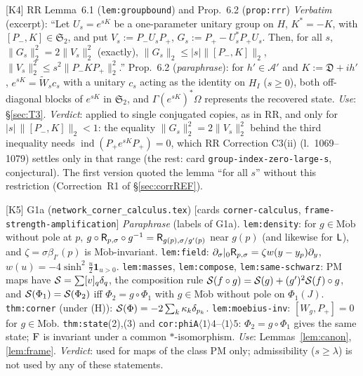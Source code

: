 \documentclass[11pt]{article}
\newcommand{\Pp}{P_+}\newcommand{\Pm}{P_-}\newcommand{\Stwo}{\mathfrak S_2}\newcommand{\Sone}{\mathfrak S_1}
\newcommand{\norm}[1]{\lVert#1\rVert}\newcommand{\abs}[1]{\lvert#1\rvert}\newcommand{\ip}[2]{\langle#1,#2\rangle}
\newcommand{\one}{\mathbf 1}\newcommand{\Om}{\Omega}\newcommand{\Gh}{\widehat G}\newcommand{\Dc}{\mathfrak D}
\newcommand{\Mob}{\operatorname{M\ddot ob}}\newcommand{\Wt}{\widetilde W}\newcommand{\kt}{\widetilde k}
\theoremstyle{definition}\newtheorem{hypothesis}[theorem]{Hypothesis}
\begin{document}
\begin{citedbox}{[K4] RR Lemma~6.1 (\texttt{lem:groupbound}) and Prop.~6.2 (\texttt{prop:rrr})}
\emph{Verbatim} (excerpt): ``Let $U_s=e^{sK}$ be a one-parameter unitary group on $H$, $K^*=-K$, with
$[\Pm,K]\in\Stwo$, and put $V_s:=\Pm U_s\Pp$, $G_s:=\Pp-U_s^*\Pp U_s$.  Then, for all $s$,
$\norm{G_s}_2^2=2\norm{V_s}_2^2$ (exactly), $\norm{G_s}_2\le\abs s\norm{[\Pm,K]}_2$,
$\norm{V_s}_2^2\le s^2\norm{\Pm K\Pp}_2^2$.''  Prop.~6.2 (\emph{paraphrase}): for $h'\in\mathcal A'$ and
$K:=\Dc+ih'$, $e^{sK}=\Wt_sc_s$ with a unitary $c_s$ acting as the identity on $H_I$ ($s\ge0$), both
off-diagonal blocks of $e^{sK}$ in $\Stwo$, and $\Gamma(e^{sK})^*\Om$ represents the recovered state.
\emph{Use}: \S\ref{sec:T3}.  \emph{Verdict}: applied to single conjugated copies, as in RR, and only for
$\abs s\,\norm{[\Pm,K]}_2<1$: the equality $\norm{G_s}_2^2=2\norm{V_s}_2^2$ behind the third inequality needs
$\operatorname{ind}(\Pp e^{sK}\Pp)=0$, which RR Correction C3(ii) (l.~1069--1079) settles only in that range (the
rest: card \texttt{group-index-zero-large-s}, conjectural).  The first version quoted the lemma ``for all $s$''
without this restriction (Correction~R1 of \S\ref{sec:corrREF}).
\end{citedbox}

\begin{citedbox}{[K5] G1a (\texttt{network\_corner\_calculus.tex}) [cards \texttt{corner-calculus},
\texttt{frame-strength-amplification}]}
\emph{Paraphrase} (labels of G1a).  \texttt{lem:density}: for $g\in\Mob$ without pole at $p$,
$g\circ\mathsf R_{p,\sigma}\circ g^{-1}=\mathsf R_{g(p),\sigma/g'(p)}$ near $g(p)$ (and likewise for $\mathsf L$), and
$\zeta=\sigma\beta_{I'}(p)$ is $\Mob$-invariant.  \texttt{lem:field}: $\partial_\sigma|_0\mathsf R_{p,\sigma}=
\zeta w(y-y_p)\partial_y$, $w(u)=-4\sinh^2\frac u2\one_{u>0}$.  \texttt{lem:masses}, \texttt{lem:compose},
\texttt{lem:same-schwarz}: $\mathrm{PM}$ maps have $\mathcal S=\sum[v]_q\delta_q$, the composition rule
$\mathcal S(f\circ g)=\mathcal S(g)+(g')^2\mathcal S(f)\circ g$, and $\mathcal S(\Phi_1)=\mathcal S(\Phi_2)$ iff $\Phi_2=g\circ\Phi_1$ with
$g\in\Mob$ without pole on $\Phi_1(J)$.  \texttt{thm:corner} (under (H)): $\mathcal S(\Phi)=-2\sum_k\kappa_k
\delta_{p_k}$.  \texttt{lem:moebius-inv}: $[W_g,\Pp]=0$ for $g\in\Mob$.  \texttt{thm:state}(2),(3) and
\texttt{cor:phiA}$\langle1\rangle4$--$\langle1\rangle5$: $\Phi_2=g\circ\Phi_1$ gives the same state;
$\operatorname{F}$ is invariant under a common $*$-isomorphism.  \emph{Use}: Lemmas~\ref{lem:canon}, \ref{lem:frame}.
\emph{Verdict}: used for maps of the class $\mathrm{PM}$ only; admissibility ($s\ge\lambda$) is not used by
any of these statements.
\end{citedbox}
\end{document}
